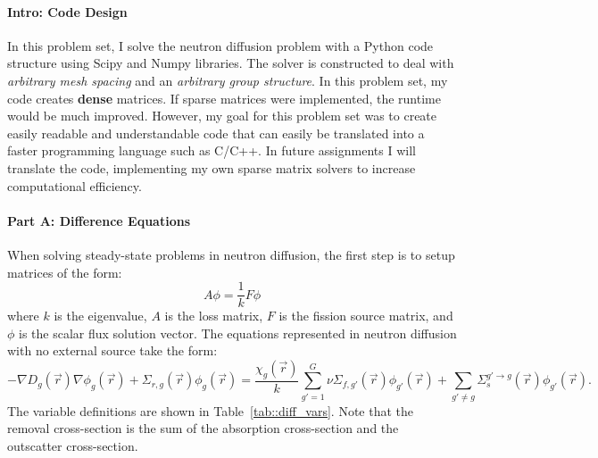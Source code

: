 \documentclass[12pt]{report}
\begin{document}
	
	
	\maketitle
	
	\paragraph{Intro: Code Design}
	In this problem set, I solve the neutron diffusion problem with a Python code structure using Scipy and Numpy libraries. The solver is constructed to deal with \textit{arbitrary mesh spacing} and an \textit{arbitrary group structure}. In this problem set, my code creates \textbf{dense} matrices. If sparse matrices were implemented, the runtime would be much improved. However, my goal for this problem set was to create easily readable and understandable code that can easily be translated into a faster programming language such as C/C++. In future assignments I will translate the code, implementing my own sparse matrix solvers to increase computational efficiency.
	
	\paragraph{Part A: Difference Equations}
	When solving steady-state problems in neutron diffusion, the first step is to setup matrices of the form:
	\begin{equation}
	A \phi = \frac{1}{k} F \phi
	\label{eq::matrix}
	\end{equation}
	where $k$ is the eigenvalue, $A$ is the loss matrix, $F$ is the fission source matrix, and $\phi$ is the scalar flux solution vector. The equations represented in neutron diffusion with no external source take the form:
	\begin{equation}
	- \nabla D_g(\vec{r}) \nabla \phi_g(\vec{r}) + \Sigma_{r,g}(\vec{r}) \phi_g(\vec{r}) = \frac{\chi_g(\vec{r})}{k} \sum_{g'=1}^{G} \nu \Sigma_{f,g'}(\vec{r}) \phi_{g'}(\vec{r}) + \sum_{g'\neq g} \Sigma_{s}^{g' \rightarrow g}(\vec{r}) \phi_{g'}(\vec{r}).
	\end{equation}
	The variable definitions are shown in Table~\ref{tab::diff_vars}. Note that the removal cross-section is the sum of the absorption cross-section and the outscatter cross-section.
	
\end{document}
